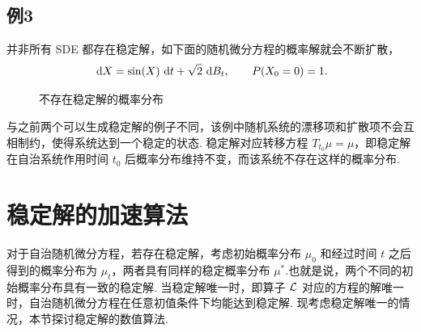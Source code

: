 \subsection*{例3}
并非所有 SDE 都存在稳定解，如下面的随机微分方程的概率解就会不断扩散，
\[
\text{ d} X = \sin(X) \text{ d} t + \sqrt{2} \text{ d} B_t,\qquad P(X_0 = 0)=1.
\]
\begin{figure}[!htbp]
	\centering 
	\centering
	\vspace{.2cm}
	\caption{不存在稳定解的概率分布}
	\label{measure_4_3}
\end{figure}
与之前两个可以生成稳定解的例子不同，该例中随机系统的漂移项和扩散项不会互相制约，使得系统达到一个稳定的状态. 
稳定解对应转移方程 $T_{t_0} \mu = \mu$，即稳定解在自治系统作用时间 $t_0$ 后概率分布维持不变，而该系统不存在这样的概率分布. 


\section{稳定解的加速算法}
对于自治随机微分方程，若存在稳定解，考虑初始概率分布 $\mu_0$ 和经过时间 $t$ 之后得到的概率分布为 $\mu_t$，两者具有同样的稳定概率分布 $\mu^*$.也就是说，两个不同的初始概率分布具有一致的稳定解. 
当稳定解唯一时，即算子 $\mathcal{L}$ 对应的方程的解唯一时，自治随机微分方程在任意初值条件下均能达到稳定解. 现考虑稳定解唯一的情况，本节探讨稳定解的数值算法. 

